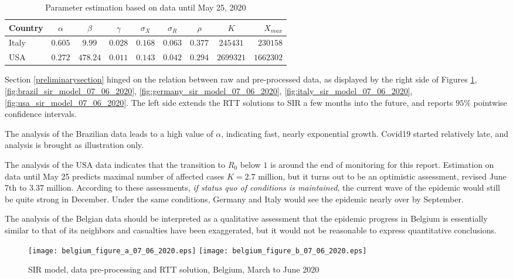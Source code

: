 \documentclass{article}
\begin{document}
{\bigskip

\begin{table}
\begin{center}
\begin{tabular}{l|ccccccc|r}
Country & $\alpha$ & $\beta$ & $\gamma$ & $\sigma_X $ & $ \sigma_R$ & $\rho$ & $K$ & $X_{max}$ \\ \hline
Italy  & $0.605$ & $9.99$ & $0.028$ & $0.168$ & $0.063$ & $0.377$ & $245431$ & $230158$ \\
USA    & $0.272$  & $478.24$ & $0.011$ & $0.143$ & $0.042$ & $0.294$ & $2699321$ & $1662302$\\ \hline
\end{tabular}
\caption{
Parameter estimation based on data until May 25, 2020
\label{tablemay25}
}
\end{center}
\end{table}


Section \ref{preliminarysection} hinged on the relation between raw and pre-processed data, as displayed by the right side of Figures \ref{fig:belgium_sir_model_07_06_2020}, \ref{fig:brazil_sir_model_07_06_2020}, \ref{fig:germany_sir_model_07_06_2020}, \ref{fig:italy_sir_model_07_06_2020}, \ref{fig:usa_sir_model_07_06_2020}. The left side extends the RTT solutions to SIR a few months into the future, and reports $95\%$ pointwise confidence intervals.

The analysis of the Brazilian data leads to a high value of $\alpha$, indicating fast, nearly exponential growth. Covid19 started relatively late, and analysis is brought as illustration only.

The analysis of the USA data indicates that the transition to $R_0$ below $1$ is around the end of monitoring for this report. Estimation on data until May 25 predicts maximal number of affected cases $K=2.7$ million, but it turns out to be an optimistic assessment, revised June 7th to $3.37$ million. According to these assessments, {\em if status quo of conditions is maintained}, the current wave of the epidemic would still be quite strong in December. Under the same conditions, Germany and Italy would see the epidemic nearly over by September.

The analysis of the Belgian data should be interpreted as a qualitative assessment that the epidemic progress in Belgium is essentially similar to that of its neighbors and casualties have been exaggerated, but it would not be reasonable to express quantitative conclusions.

\begin{figure}
\begin{center}
{\texttt{[image: belgium\_figure\_a\_07\_06\_2020.eps]}}
\qquad
{\texttt{[image: belgium\_figure\_b\_07\_06\_2020.eps]}}
\end{center}
\begin{center}
\caption{SIR model, data pre-processing and RTT solution, Belgium, March to June 2020
}
\label{fig:belgium_sir_model_07_06_2020}
\end{center}
\end{figure}

}
\end{document}
